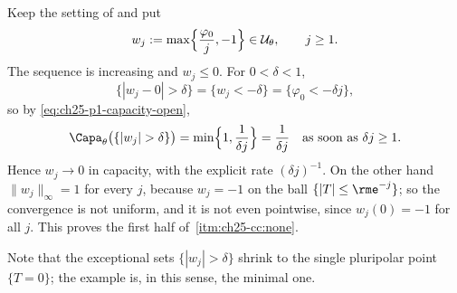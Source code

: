 \begin{example}
\label{ex:ch25-capacity-not-uniform}
Keep the setting of  and put
\[
 w_j:=\max\Bigl\{\frac{\varphi_0}{j},-1\Bigr\}\in\mathcal U_\theta,
 \qquad j\geq1 .
\]
The sequence is increasing and $w_j\leq0$.  For $0<\delta<1$,
\[
 \{|w_j-0|>\delta\}=\{w_j<-\delta\}=\{\varphi_0<-\delta j\},
\]
so by \eqref{eq:ch25-p1-capacity-open},
\[
 \Capa_\theta\bigl(\{|w_j|>\delta\}\bigr)
 =\min\Bigl\{1,\frac1{\delta j}\Bigr\}
 =\frac1{\delta j}\quad\text{as soon as }\delta j\geq1 .
\]
Hence $w_j\to0$ in capacity, with the explicit rate
$(\delta j)^{-1}$.  On the other hand $\|w_j\|_\infty=1$ for every
$j$, because $w_j=-1$ on the ball $\{|T|\leq\rme^{-j}\}$; so the
convergence is not uniform, and it is not even pointwise, since
$w_j(0)=-1$ for all $j$.  This proves the first half of
\,\cref{itm:ch25-cc:none}.

Note that the exceptional sets $\{|w_j|>\delta\}$ shrink to the single
pluripolar point $\{T=0\}$; the example is, in this sense, the minimal one.
\end{example}

